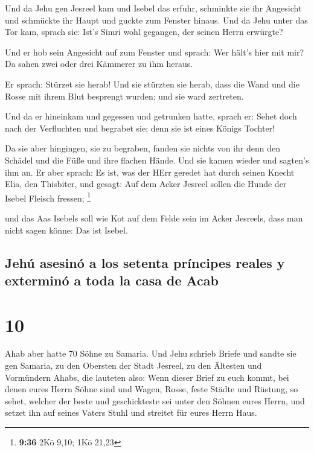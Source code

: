  Und da Jehu gen Jesreel kam und Isebel das erfuhr,
schminkte sie ihr Angesicht und schmückte ihr Haupt und guckte zum
Fenster hinaus.  Und da Jehu unter das Tor kam, sprach
sie: Ist's Simri wohl gegangen, der seinen Herrn erwürgte?

 Und er hob sein Angesicht auf zum Fenster und sprach:
Wer hält's hier mit mir? Da sahen zwei oder drei Kämmerer zu ihm heraus.

 Er sprach: Stürzet sie herab! Und sie stürzten sie
herab, dass die Wand und die Rosse mit ihrem Blut besprengt wurden; und
sie ward zertreten.

 Und da er hineinkam und gegessen und getrunken hatte,
sprach er: Sehet doch nach der Verfluchten und begrabet sie; denn sie
ist eines Königs Tochter!

 Da sie aber hingingen, sie zu begraben, fanden sie
nichts von ihr denn den Schädel und die Füße und ihre flachen Hände.
 Und sie kamen wieder und sagten's ihm an. Er aber
sprach: Es ist, was der HErr geredet hat durch seinen Knecht Elia, den
Thisbiter, und gesagt: Auf dem Acker Jesreel sollen die Hunde der Isebel
Fleisch fressen; \footnote{\textbf{9:36} 2Kö 9,10; 1Kö 21,23}

 und das Aas Isebels soll wie Kot auf dem Felde sein im
Acker Jesreels, dass man nicht sagen könne: Das ist Isebel.

\hypertarget{jehuxfa-asesinuxf3-a-los-setenta-pruxedncipes-reales-y-exterminuxf3-a-toda-la-casa-de-acab}{%
\subsection{Jehú asesinó a los setenta príncipes reales y exterminó a
toda la casa de
Acab}\label{jehuxfa-asesinuxf3-a-los-setenta-pruxedncipes-reales-y-exterminuxf3-a-toda-la-casa-de-acab}}

\hypertarget{section-9}{%
\section{10}\label{section-9}}

 Ahab aber hatte 70 Söhne zu Samaria. Und Jehu schrieb
Briefe und sandte sie gen Samaria, zu den Obersten der Stadt Jesreel, zu
den Ältesten und Vormündern Ahabs, die lauteten also: 
Wenn dieser Brief zu euch kommt, bei denen eures Herrn Söhne sind und
Wagen, Rosse, feste Städte und Rüstung,  so sehet, welcher
der beste und geschickteste sei unter den Söhnen eures Herrn, und setzet
ihn auf seines Vaters Stuhl und streitet für eures Herrn Haus.

